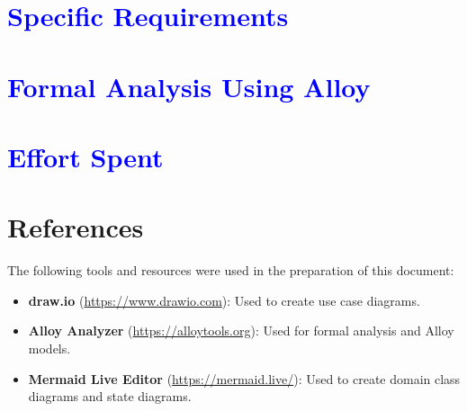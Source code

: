 \documentclass[11pt]{article}
\begin{document}
\clearpage
\section{\textcolor{blue}{Specific Requirements}}\label{sect:requirements}


\clearpage
\section{\textcolor{blue}{Formal Analysis Using Alloy}}\label{sect:alloy}


\clearpage
\section{\textcolor{blue}{Effort Spent}}\label{sect:effort}


\clearpage
\section*{References}
The following tools and resources were used in the preparation of this document:
\begin{itemize}
    \item \textbf{draw.io} (\url{https://www.drawio.com}): Used to create use case diagrams.
    \item \textbf{Alloy Analyzer} (\url{https://alloytools.org}): Used for formal analysis and Alloy models.
    \item \textbf{Mermaid Live Editor} (\url{https://mermaid.live/}): Used to create domain class diagrams and state diagrams.
\end{itemize}


\clearpage
{}
%
%
\end{document}
